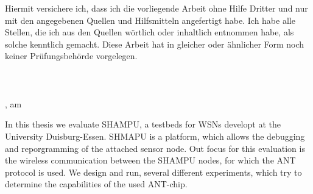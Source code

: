 Hiermit versichere ich, dass ich die vorliegende Arbeit ohne Hilfe Dritter und nur mit den angegebenen Quellen und
Hilfsmitteln angefertigt habe. Ich habe alle Stellen, die ich aus den Quellen wörtlich oder inhaltlich entnommen habe,
als solche kenntlich gemacht. Diese Arbeit hat in gleicher oder ähnlicher Form noch keiner Prüfungsbehörde vorgelegen.\\
\\
\\
\\
\ort, am \datum

In this thesis we evaluate SHAMPU, a testbeds for WSNs developt at the University Duisburg-Essen. 
SHMAPU is a platform, which allows the debugging and reporgramming of the attached sensor node.
Out focus for this evaluation is the wireless communication between the SHAMPU nodes, for which the ANT protocol is used. We design and run, several different experiments, which try to determine the capabilities of the used ANT-chip.
